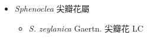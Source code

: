 
  \begin{itemize}
 \item[] \textit{Sphenoclea} 尖瓣花屬
                                
  \begin{itemize}
        \item[] \textit{S. zeylanica} Gaertn.  尖瓣花   LC
  \end{itemize}
  \end{itemize}
